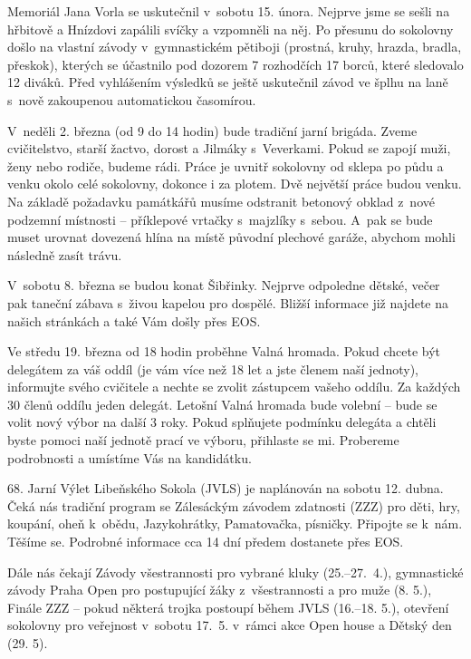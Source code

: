 \documentclass[11pt]{article}
\begin{document}
Memoriál Jana Vorla se uskutečnil v~sobotu 15. února. Nejprve jsme se sešli na hřbitově a Hnízdovi zapálili svíčky a vzpomněli na něj. Po přesunu do sokolovny došlo na vlastní závody v~gymnastickém pětiboji (prostná, kruhy, hrazda, bradla, přeskok), kterých se účastnilo pod dozorem 7 rozhodčích 17 borců, které sledovalo 12 diváků. Před vyhlášením výsledků se ještě uskutečnil závod ve šplhu na laně s~nově zakoupenou automatickou časomírou. 

V~neděli 2. března (od 9 do 14 hodin) bude tradiční jarní brigáda. Zveme cvičitelstvo, starší žactvo, dorost a Jilmáky s~Veverkami. Pokud se zapojí muži, ženy nebo rodiče, budeme rádi. Práce je uvnitř sokolovny od sklepa po půdu a venku okolo celé sokolovny, dokonce i za plotem. Dvě největší práce budou venku. Na základě požadavku památkářů musíme odstranit betonový obklad z~nové podzemní místnosti – příklepové vrtačky s~majzlíky s~sebou. A~pak se bude muset urovnat dovezená hlína na místě původní plechové garáže, abychom mohli následně zasít trávu.

V~sobotu 8. března se budou konat Šibřinky. Nejprve odpoledne dětské, večer pak taneční zábava s~živou kapelou pro dospělé. Bližší informace již najdete na našich stránkách a také Vám došly přes EOS.

Ve středu 19. března od 18 hodin proběhne Valná hromada. Pokud chcete být delegátem za váš oddíl (je vám více než 18 let a jste členem naší jednoty), informujte svého cvičitele a nechte se zvolit zástupcem vašeho oddílu. Za každých 30 členů oddílu jeden delegát. Letošní Valná hromada bude volební – bude se volit nový výbor na další 3 roky. Pokud splňujete podmínku delegáta a chtěli byste pomoci naší jednotě prací ve výboru, přihlaste se mi. Probereme podrobnosti a umístíme Vás na kandidátku.

68. Jarní Výlet Libeňského Sokola (JVLS) je naplánován na sobotu 12. dubna. Čeká nás tradiční program se Zálesáckým závodem zdatnosti (ZZZ) pro děti, hry, koupání, oheň k~obědu, Jazykohrátky, Pamatovačka, písničky. Připojte se k~nám. Těšíme se. Podrobné informace cca 14 dní předem dostanete přes EOS.

Dále nás čekají Závody všestrannosti pro vybrané kluky (25.–27.~4.), gymnastické závody Praha Open pro postupující žáky z~všestrannosti a pro muže (8. 5.), Finále ZZZ – pokud některá trojka postoupí během JVLS (16.–18. 5.), otevření sokolovny pro veřejnost v~sobotu 17.~5. v~rámci akce Open house a Dětský den (29. 5).
\end{document}
